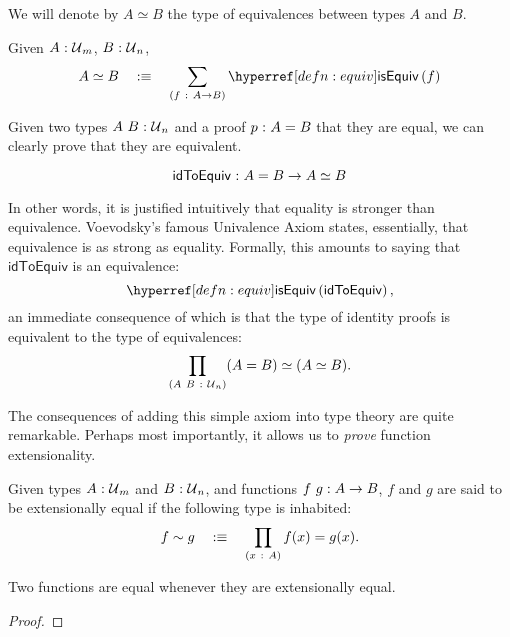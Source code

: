 We will denote by $A \simeq B$ the type of equivalences between types $A$ and $B$.
\begin{defn}
  Given $A\hspace{0.1mm}:\hspace{0.1mm}\mathcal{U}{}_m$, $B\hspace{0.1mm}:\hspace{0.1mm}\mathcal{U}{}_n$,
  \begin{equation*}
    A \simeq B \quad\is\quad \sigmaty{f}{A \rightarrow B}{\isequiv{f}}
  \end{equation*}
\end{defn}

Given two types $A~B\hspace{0.1mm}:\hspace{0.1mm}\mathcal{U}{}_n$ and a proof $p\hspace{0.1mm}:\hspace{0.1mm}A = B$ that
they are equal, we can clearly prove that they are equivalent.
\begin{defn}
  \begin{equation*}
    \mathsf{idToEquiv}\hspace{0.1mm}:\hspace{0.1mm}A = B \rightarrow A \simeq B
  \end{equation*}
\end{defn}
In other words, it is justified intuitively that equality is stronger than equivalence.
Voevodsky's famous Univalence Axiom states, essentially, that equivalence is as strong as
equality. Formally, this amounts to saying that $\mathsf{idToEquiv}$ is an equivalence:
\begin{equation*}
  \isequiv{\idtoeqvnm{}},
\end{equation*}
an immediate consequence of which is that the type of identity proofs is equivalent to the
type of equivalences:
\begin{equation*}
  \prod_{(A~B~:~\mathcal{U}{}_n)} (A = B) \simeq (A \simeq B).
\end{equation*}

The consequences of adding this simple axiom into type theory are quite remarkable.
Perhaps most importantly, it allows us to \emph{prove} function extensionality.
\begin{defn}\label{defn:exteq}
  Given types $A\hspace{0.1mm}:\hspace{0.1mm}\mathcal{U}{}_m$ and $B\hspace{0.1mm}:\hspace{0.1mm}\mathcal{U}{}_n$, and functions
  $f~g:A \rightarrow B$, $f$ and $g$ are said to be extensionally equal if
  the following type is inhabited:
  \begin{equation*}
    f \sim g \quad:\equiv\quad \prod_{(x~:~A)} f(x) = g(x).
  \end{equation*}
\end{defn}

\begin{prop}\label{prop:funext}
  Two functions are equal whenever they are extensionally equal.
\end{prop}
\begin{proof}
\end{proof}

